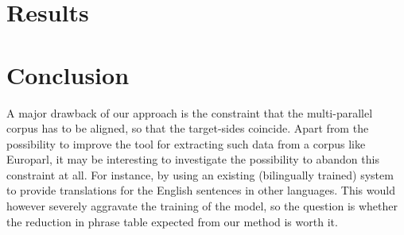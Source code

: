 \documentclass[11pt]{article}
\begin{document}
\newpage


\section{Results}




\section{Conclusion}

A major drawback of our approach is the constraint that the multi-parallel corpus has to be aligned, so that the target-sides coincide. Apart from the possibility to improve the tool for extracting such data from a corpus like Europarl, it may be interesting to investigate the possibility to abandon this constraint at all. For instance, by using an existing (bilingually trained) system to provide translations for the English sentences in other languages. This would however severely aggravate the training of the model, so the question is whether the reduction in phrase table expected from our method is worth it.
\end{document}
